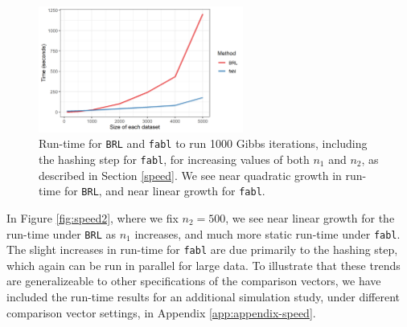 \documentclass[ba]{imsart}
\begin{document}
	\begin{figure}[t]
		\begin{center} \includegraphics[width=0.6\textwidth]{../notes/figures/sadinle_speed_plot2} 
			\caption{Run-time for \texttt{BRL} and \texttt{fabl} to run 1000 Gibbs iterations, including the hashing step for \texttt{fabl}, for increasing values of both $n_1$ and $n_2$, as described in Section \ref{speed}. We see near quadratic growth in run-time for \texttt{BRL}, and near linear growth for \texttt{fabl}.}\label{fig:speed1}
		\end{center}
	\end{figure}
	
	
	In Figure \ref{fig:speed2}, where we fix \(n_2 = 500\), we see near linear growth for the run-time under \texttt{BRL} as \(n_1\) increases, and much more static run-time under \texttt{fabl}. The slight increases in run-time for \texttt{fabl} are due primarily to the hashing step, which again can be run in parallel for large data. To illustrate that these trends are generalizeable to other specifications of the comparison vectors, we have included the run-time results for an additional simulation study, under different comparison vector settings, in Appendix \ref{app:appendix-speed}.
	
\end{document}
